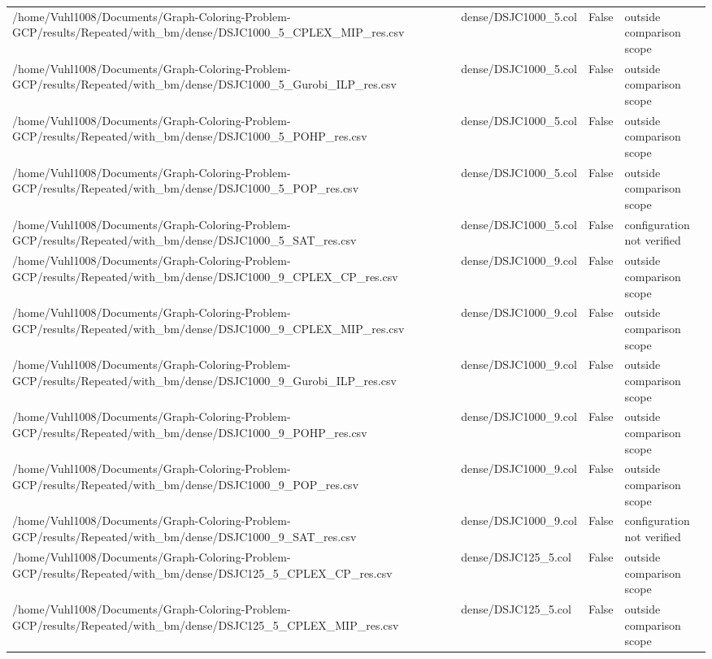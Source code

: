 \begin{table}[htbp]
\begin{tabular}{llll}
/home/Vuhl1008/Documents/Graph-Coloring-Problem-GCP/results/Repeated/with\_bm/dense/DSJC1000\_5\_CPLEX\_MIP\_res.csv & dense/DSJC1000\_5.col & False & outside comparison scope \\
/home/Vuhl1008/Documents/Graph-Coloring-Problem-GCP/results/Repeated/with\_bm/dense/DSJC1000\_5\_Gurobi\_ILP\_res.csv & dense/DSJC1000\_5.col & False & outside comparison scope \\
/home/Vuhl1008/Documents/Graph-Coloring-Problem-GCP/results/Repeated/with\_bm/dense/DSJC1000\_5\_POHP\_res.csv & dense/DSJC1000\_5.col & False & outside comparison scope \\
/home/Vuhl1008/Documents/Graph-Coloring-Problem-GCP/results/Repeated/with\_bm/dense/DSJC1000\_5\_POP\_res.csv & dense/DSJC1000\_5.col & False & outside comparison scope \\
/home/Vuhl1008/Documents/Graph-Coloring-Problem-GCP/results/Repeated/with\_bm/dense/DSJC1000\_5\_SAT\_res.csv & dense/DSJC1000\_5.col & False & configuration not verified \\
/home/Vuhl1008/Documents/Graph-Coloring-Problem-GCP/results/Repeated/with\_bm/dense/DSJC1000\_9\_CPLEX\_CP\_res.csv & dense/DSJC1000\_9.col & False & outside comparison scope \\
/home/Vuhl1008/Documents/Graph-Coloring-Problem-GCP/results/Repeated/with\_bm/dense/DSJC1000\_9\_CPLEX\_MIP\_res.csv & dense/DSJC1000\_9.col & False & outside comparison scope \\
/home/Vuhl1008/Documents/Graph-Coloring-Problem-GCP/results/Repeated/with\_bm/dense/DSJC1000\_9\_Gurobi\_ILP\_res.csv & dense/DSJC1000\_9.col & False & outside comparison scope \\
/home/Vuhl1008/Documents/Graph-Coloring-Problem-GCP/results/Repeated/with\_bm/dense/DSJC1000\_9\_POHP\_res.csv & dense/DSJC1000\_9.col & False & outside comparison scope \\
/home/Vuhl1008/Documents/Graph-Coloring-Problem-GCP/results/Repeated/with\_bm/dense/DSJC1000\_9\_POP\_res.csv & dense/DSJC1000\_9.col & False & outside comparison scope \\
/home/Vuhl1008/Documents/Graph-Coloring-Problem-GCP/results/Repeated/with\_bm/dense/DSJC1000\_9\_SAT\_res.csv & dense/DSJC1000\_9.col & False & configuration not verified \\
/home/Vuhl1008/Documents/Graph-Coloring-Problem-GCP/results/Repeated/with\_bm/dense/DSJC125\_5\_CPLEX\_CP\_res.csv & dense/DSJC125\_5.col & False & outside comparison scope \\
/home/Vuhl1008/Documents/Graph-Coloring-Problem-GCP/results/Repeated/with\_bm/dense/DSJC125\_5\_CPLEX\_MIP\_res.csv & dense/DSJC125\_5.col & False & outside comparison scope \\

\end{tabular}
\end{table}
